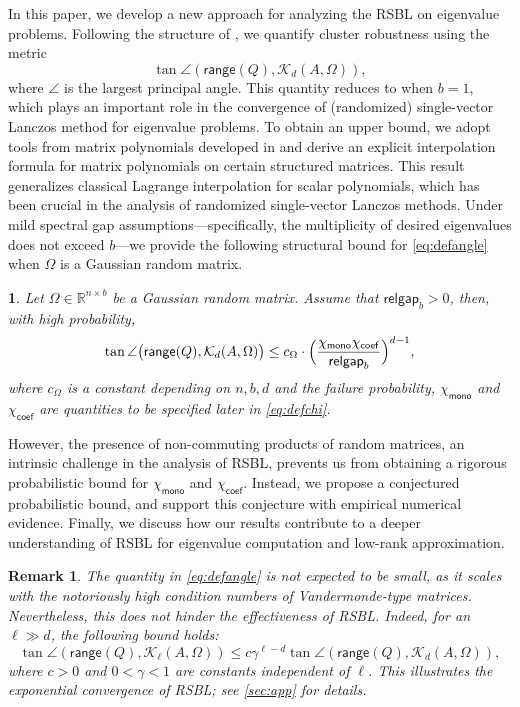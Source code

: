 \documentclass{article}
\newtheorem{remark}{Remark}%
\newcommand{\chim}{\chi_{\mathsf{mono}}}
\newcommand{\chic}{\chi_{\mathsf{coef}}}
\newcommand{\R}{\mathbb{R}}
\newcommand{\range}{\mathsf{range}}
\newcommand{\gap}{\mathsf{relgap}}
\newtheorem*{customthm}{\customthmname}
\newenvironment{namedthm}[1]
  {\newcommand{\customthmname}{#1}\begin{customthm}}
  {\end{customthm}}
\begin{document}
In this paper, we develop a new approach for analyzing the RSBL on eigenvalue problems. 
Following the structure of \cite{Meyer2023,kressner2024randomized}, 
we quantify cluster robustness using the metric
\begin{equation}
\label{eq:defangle}
\tan\angle (\range(Q),\mathcal{K}_{d}(A,\Omega)),
\end{equation}
where $\angle$ is the largest principal angle.
This quantity reduces to  \cite[Eq.~(3.5)]{kressner2024randomized} when $b=1$, which plays an important role in the convergence of (randomized) single-vector Lanczos method for eigenvalue problems.
To obtain an upper bound, we adopt tools from matrix polynomials developed in \cite{Dennis1976} and derive an explicit interpolation formula for matrix polynomials on certain structured matrices. This result generalizes classical Lagrange interpolation for scalar polynomials, which has been crucial in the analysis of randomized single-vector Lanczos methods.
Under mild spectral gap assumptions---specifically, the multiplicity of desired eigenvalues does not exceed $b$---we provide the following structural bound for \cref{eq:defangle} when $\Omega$ is a Gaussian random matrix. 

\begin{namedthm}{Abridged of \cref{thm:sb}}
    Let $\Omega\in\R^{n\times b}$ be a Gaussian random matrix. Assume that $\gap_{b}>0$, then, with high probability, 
\begin{equation*}
    \tan\angle\bigl(\range(Q),\mathcal{K}_{d}(A,\Omega)\bigr) \leq c_{\Omega}\cdot \Bigl(\frac{\chim\chic}{\gap_{b}}\Bigr)^{d-1},
\end{equation*}
where $c_{\Omega}$ is a constant depending on $n,b,d$ and the failure probability, $\chim$ and $\chic$ are quantities to be specified later in \cref{eq:defchi}.
\end{namedthm}

However, the presence of non-commuting products of random matrices, an intrinsic challenge in the analysis of RSBL, prevents us from obtaining a rigorous probabilistic bound for $\chim$ and $\chic$.
Instead, we propose a conjectured probabilistic bound, and support this conjecture with empirical numerical evidence.
Finally, we discuss how our results contribute to a deeper understanding of RSBL for eigenvalue computation and low-rank approximation.

\begin{remark}
    \label{rmk:intro}
The quantity in \cref{eq:defangle} is not expected to be small, as it scales with the notoriously high condition numbers of Vandermonde-type matrices. Nevertheless, this does not hinder the effectiveness of RSBL. Indeed, for an $\ell\gg d$, the following bound holds:
\begin{equation*}
    \tan \angle(\range(Q),\mathcal{K}_{\ell}(A,\Omega)) \leq c\gamma^{\ell-d}\tan\angle(\range(Q),\mathcal{K}_{d}(A,\Omega)),
\end{equation*}
where $c>0$ and $0<\gamma<1$ are constants independent of $\ell$. This illustrates the exponential convergence of RSBL; see \cref{sec:app} for details.
\end{remark}
\end{document}
